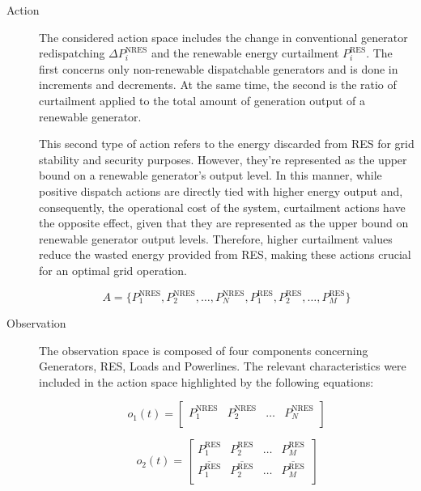 \begin{description}
	\item[Action] The considered action space includes the change in conventional generator redispatching $\Delta P^\text{NRES}_i$ and the renewable energy curtailment $P^\text{RES}_i$. The first concerns only non-renewable dispatchable generators and is done in increments and decrements. At the same time, the second is the ratio of curtailment applied to the total amount of generation output of a renewable generator. \par
	This second type of action refers to the energy discarded from \ac{RES} for grid stability and security purposes. However, they're represented as the upper bound on a renewable generator's output level. In this manner, while positive dispatch actions are directly tied with higher energy output and, consequently, the operational cost of the system, curtailment actions have the opposite effect, given that they are represented as the upper bound on renewable generator output levels. Therefore, higher curtailment values reduce the wasted energy provided from \ac{RES}, making these actions crucial for an optimal grid operation.
	
	\begin{equation} \label{eq:action-space}
		A = \{P^\text{NRES}_1, P^\text{NRES}_2, \dots, P^\text{NRES}_N, P^\text{RES}_1, P^\text{RES}_2, \dots, P^\text{RES}_M\}
	\end{equation}
	
	\item[Observation] The observation space is composed of four components concerning Generators, \ac{RES}, Loads and Powerlines. The relevant characteristics were included in the action space highlighted by the following equations:
	
	\begin{equation} \label{eq:simple-obs-space1}
		o_{1}(t)= \begin{bmatrix}
			P^\text{NRES}_1 & P^\text{NRES}_2 & \dots & P^\text{NRES}_{N} \\
		\end{bmatrix}
	\end{equation}
	
	\begin{equation} \label{eq:simple-obs-space2}
		o_{2}(t)= \begin{bmatrix}
			P^\text{RES}_1 & P^\text{RES}_2 & \dots & P^\text{RES}_{M} \\
			\overline{P^\text{RES}_1} & \overline{P^\text{RES}_2} & \dots & \overline{P^\text{RES}_{M}} \\
		\end{bmatrix}
	\end{equation}
	

\end{description}
